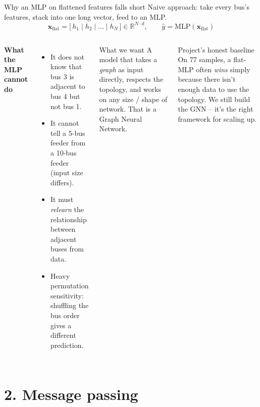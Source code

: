 \documentclass[aspectratio=169,10pt]{beamer}
\begin{document}
\begin{frame}{Why an MLP on flattened features falls short}
Naive approach: take every bus's features, stack into one long vector, feed to an MLP.
\begin{equation*}
\mathbf{x}_{\text{flat}} = \bigl[\, h_1 \mid h_2 \mid \ldots \mid h_N \,\bigr] \in \mathbb{R}^{N \cdot d}, \qquad \hat{y} = \text{MLP}(\mathbf{x}_{\text{flat}})
\end{equation*}
\vspace{0.2em}
\begin{columns}[T]
\textbf{What the MLP cannot do}
\begin{itemize}
  \item It does not know that bus 3 is adjacent to bus 4 but not bus 1.
  \item It cannot tell a 5-bus feeder from a 10-bus feeder (input size differs).
  \item It must \emph{relearn} the relationship between adjacent buses from data.
  \item Heavy permutation sensitivity: shuffling the bus order gives a different prediction.
\end{itemize}
\begin{block}{What we want}
A model that takes a \emph{graph} as input directly, respects the topology, and works on any size / shape of network. That is a Graph Neural Network.
\end{block}
\begin{alertblock}{Project's honest baseline}
On 77 samples, a flat-MLP often \emph{wins} simply because there isn't enough data to use the topology. We still build the GNN -- it's the right framework for scaling up.
\end{alertblock}
\end{columns}
\end{frame}

\section*{2. Message passing}
\end{document}
